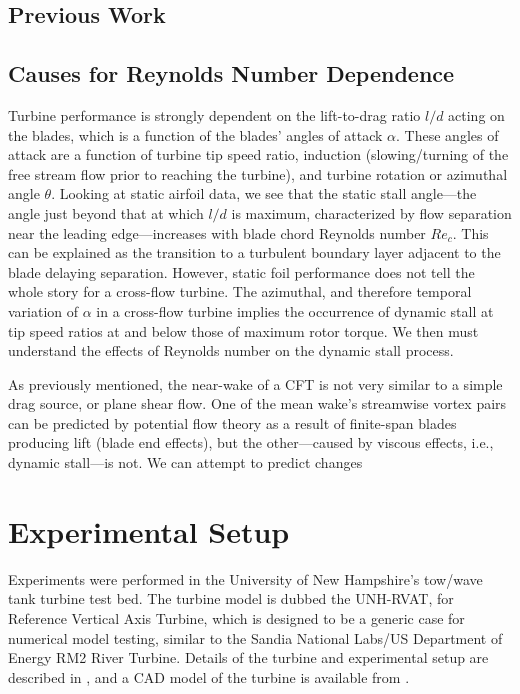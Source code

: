 \documentclass[energies,article,accept,moreauthors,pdftex,12pt,a4paper]{mdpi}
\begin{document}
\subsection{Previous Work}

\subsection{Causes for Reynolds Number Dependence}

Turbine performance is strongly dependent on the lift-to-drag ratio $l/d$ acting
on the blades, which is a function of the blades' angles of attack $\alpha$.
These angles of attack are a function of turbine tip speed ratio, induction
(slowing/turning of the free stream flow prior to reaching the turbine), and
turbine rotation or azimuthal angle $\theta$. Looking at static airfoil data, we
see that the static stall angle---the angle just beyond that at which $l/d$ is
maximum, characterized by flow separation near the leading edge---increases with
blade chord Reynolds number $Re_c$. This can be explained as the transition to a
turbulent boundary layer adjacent to the blade delaying separation. However,
static foil performance does not tell the whole story for a cross-flow turbine.
The azimuthal, and therefore temporal variation of $\alpha$ in a cross-flow
turbine implies the occurrence of dynamic stall at tip speed ratios at and below
those of maximum rotor torque\cite{Para2002}. We then must understand the
effects of Reynolds number on the dynamic stall process.

As previously mentioned, the near-wake of a CFT is not very similar to a simple
drag source, or plane shear flow. One of the mean wake's streamwise vortex pairs
can be predicted by potential flow theory as a result of finite-span blades
producing lift (blade end effects), but the other---caused by viscous effects,
i.e., dynamic stall---is not. We can attempt to predict changes

\section{Experimental Setup}

Experiments were performed in the University of New Hampshire's tow/wave tank
turbine test bed. The turbine model is dubbed the UNH-RVAT, for Reference
Vertical Axis Turbine, which is designed to be a generic case for numerical
model testing, similar to the Sandia National Labs/US Department of Energy RM2
River Turbine. Details of the turbine and experimental setup are described in
\cite{Bachant2014_JOT}, and a CAD model of the turbine is available from
\cite{Bachant2014_CAD}.
\end{document}
